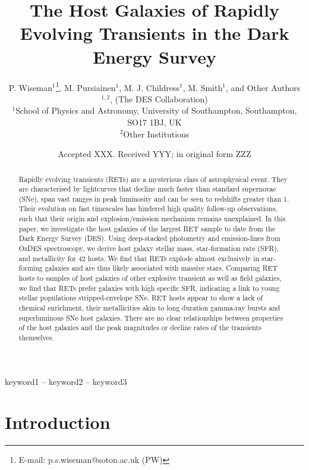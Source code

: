 \documentclass[fleqn,usenatbib,]{mnras}
\title[RET host galaxies in DES]{The Host Galaxies of Rapidly Evolving Transients in the Dark Energy Survey}
\author[P. Wiseman et al.]{
P. Wiseman$^1$\thanks{E-mail: p.s.wiseman@soton.ac.uk (PW)},
 M. Pursiainen$^1$,
 M. J. Childress$^1$,
 M. Smith$^1$,
 and Other Authors$^{1,2}$,
\newauthor
(The DES Collaboration)
\\
$^{1}$School of Physics and Astronomy, University of Southampton, Southampton, SO17 1BJ, UK\\
$^{2}$Other Institutions\\
}
\date{Accepted XXX. Received YYY; in original form ZZZ}
\begin{document}
\label{firstpage}
\pagerange{\pageref{firstpage}--\pageref{lastpage}}
\maketitle

\begin{abstract}
Rapidly evolving transients (RETs) are a mysterious class of astrophysical event. They are characterised by lightcurves that decline much faster than standard supernovae (SNe), span vast ranges in peak luminosity and can be seen to redshifts greater than 1. Their evolution on fast timescales has hindered high quality follow-up observations, such that their origin and explosion/emission mechanism remains unexplained. In this paper, we investigate the host galaxies of the largest RET sample to date from the Dark Energy Survey (DES). Using deep-stacked photometry and emission-lines from OzDES spectroscopy, we derive host galaxy stellar mass, star-formation rate (SFR), and metallicity for 42 hosts. We find that RETs explode almost exclusively in star-forming galaxies and are thus likely associated with massive stars. Comparing RET hosts to samples of host galaxies of other explosive transient as well as field galaxies, we find that RETs prefer galaxies with high specific SFR, indicating a link to young stellar populations stripped-envelope SNe. RET hosts appear to show a lack of chemical enrichment, their metallicities akin to long duration gamma-ray bursts and superluminous SNe host galaxies. There are no clear relationships between properties of the host galaxies and the peak magnitudes or decline rates of the transients themselves.

\end{abstract}

\begin{keywords}
keyword1 -- keyword2 -- keyword3
\end{keywords}



\section{Introduction}
\end{document}
